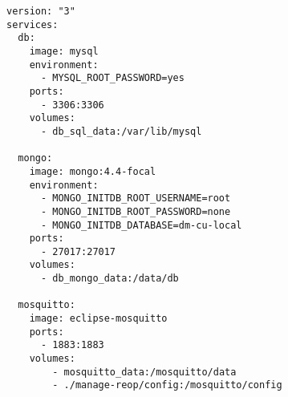 
\begin{lstlisting}[language=docker-compose-2,caption={Auxiliary Services docker-compose.yml},breaklines=true,label={code::compose_helper}]
version: "3"
services:
  db:
    image: mysql
    environment:
      - MYSQL_ROOT_PASSWORD=yes
    ports:
      - 3306:3306
    volumes:
      - db_sql_data:/var/lib/mysql

  mongo:
    image: mongo:4.4-focal
    environment:
      - MONGO_INITDB_ROOT_USERNAME=root
      - MONGO_INITDB_ROOT_PASSWORD=none
      - MONGO_INITDB_DATABASE=dm-cu-local
    ports:
      - 27017:27017
    volumes:
      - db_mongo_data:/data/db

  mosquitto:
    image: eclipse-mosquitto
    ports:
      - 1883:1883
    volumes:
        - mosquitto_data:/mosquitto/data
        - ./manage-reop/config:/mosquitto/config
\end{lstlisting}
